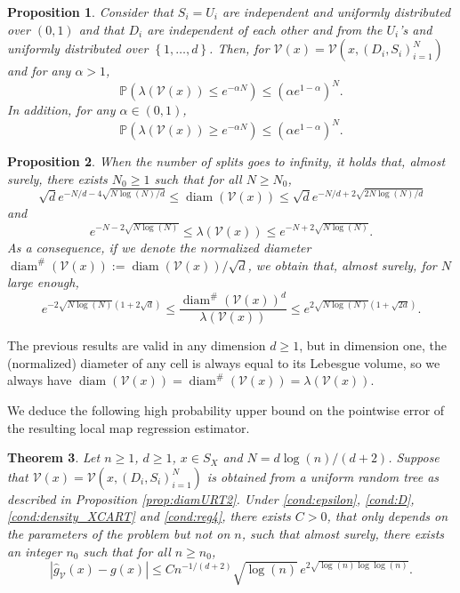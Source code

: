 \documentclass[paper=a4, fontsize=11pt]{scrartcl}
\newcommand{\diam}{\operatorname{diam}}
\newcommand{\PP}{\mathbb{P}}
\newtheorem{theorem}{Theorem}
\newtheorem{proposition}[theorem]{Proposition}
\begin{document}
\begin{proposition}\label{prop:diam_vol_URT2}
Consider  that $S_i=U_i$ are independent and uniformly distributed over $(0,1)$ and that $D_i$ are independent of each other and from the $U_i$'s and uniformly distributed over $\left\{ 1,\ldots,d\right\}$. Then, for $\mathcal V (x)= \mathcal V(x, (D_i,S_i)_{i=1}^N)$ and for any $\alpha >1$,
\begin{equation*}\label{eq_dev_vol_URT}
     \PP(\lambda(\mathcal{V}(x))\leq e^{-\alpha N}) \leq \left(\alpha e^{1-\alpha}\right)^N.
\end{equation*}
In addition, for any $\alpha \in (0,1)$,
\begin{equation*}
     \PP(\lambda(\mathcal{V}(x)) \geq e^{-\alpha N}) \leq \left(\alpha e^{1-\alpha}\right)^N.
\end{equation*}
\end{proposition}


\begin{proposition}\label{cor_diamvolURT}
When the number of splits goes to infinity, it holds that, almost surely, there exists $N_0\geq 1$ such that for all $N\geq N_0$,
$$ \sqrt d e^{-N/d-4\sqrt{N\log(N)/d}} \leq \diam(\mathcal{V}(x)) \leq \sqrt d e^{-N/d+2\sqrt{2N\log(N)/d}}$$
and
$$ e^{-N- 2\sqrt{N\log(N)}} \leq \lambda(\mathcal{V}(x)) \leq e^{-N + 2\sqrt{N\log(N)}}.$$
As a consequence, if we denote the normalized diameter $\diam^{\#}(\mathcal{V}(x)) := \diam(\mathcal{V}(x))/\sqrt{d}$, we obtain that, almost surely, for $N$ large enough, 
\begin{equation*}
  e^{-2\sqrt{N\log(N)}(1+2\sqrt{d})}   \leq \dfrac{\diam^{\#}(\mathcal{V}(x))^d}{\lambda(\mathcal{V}(x))} \leq e^{2\sqrt{N\log(N)}(1+\sqrt{2d})}. 
\end{equation*}
\end{proposition}
The previous results are valid in any dimension $d\geq 1$, but in dimension one, the (normalized) diameter of any cell is always equal to its Lebesgue volume, so we always have $\diam(\mathcal{V}(x))=\diam^{\#}(\mathcal{V}(x))=\lambda(\mathcal{V}(x))$.

We deduce  the following high probability upper bound on the pointwise error of the resulting local map regression estimator. 

\begin{theorem}\label{cor_URT}
   Let $n\geq 1$, $d\geq 1$, $x\in S_X$ and $N=d\log(n)/(d+2)$. Suppose that $\mathcal V (x)= \mathcal V(x, (D_i,S_i)_{i=1}^N)$ is obtained from a uniform random tree as described in Proposition \ref{prop:diamURT2}. Under \ref{cond:epsilon}, \ref{cond:D}, \ref{cond:density_XCART} and \ref{cond:reg4}, there exists $C>0$, that only depends on the parameters of the problem but not on $n$, such that almost surely, there exists an integer $n_0$ such that for all $ n \geq n_0$,
\[
 | \hat g_{\mathcal V}(x) - g(x)| \leq
 C n^{-1/(d+2)}\sqrt{\log(n)} \, e^{2\sqrt{\log(n)\log\log (n)}}.
\]
\end{theorem}
%
\end{document}
